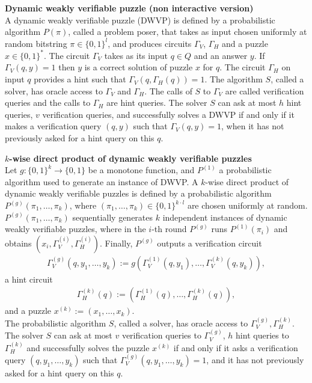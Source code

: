 \begin{definition} {\textbf{Dynamic weakly verifiable puzzle (non interactive version)}}\\
  A dynamic weakly verifiable puzzle (DWVP) is defined by a probabilistic algorithm $P(\pi)$,
  called a problem poser, that takes as input chosen uniformly at random bitstring $\pi \in \{0,1\}^l$,
  and produces circuits $\Gamma_{V}$, $\Gamma_{H}$ and a puzzle $x \in \{0,1\}^{*}$.
  The circuit $\Gamma_{V}$ takes as its input $q \in Q$ and an answer $y$.
  If $\Gamma_V(q,y) = 1$ then $y$ is a correct solution of puzzle $x$ for $q$.
  The circuit $\Gamma_H$ on input $q$ provides a hint such that $\Gamma_V(q,\Gamma_H(q)) = 1$.
  The algorithm $S$, called a solver, has oracle access to $\Gamma_V$ and $\Gamma_H$.
  The calls of $S$ to $\Gamma_V$ are called verification queries and the calls to $\Gamma_H$ are hint queries.
  The solver $S$ can ask at most $h$ hint queries, $v$ verification queries, and successfully solves a DWVP if and only if
  it makes a verification query $(q,y)$ such that $\Gamma_V(q,y) = 1$, when it has not previously asked for a hint query on this $q$.
\end{definition}
%
%
\begin{definition}{\textbf{$k$-wise direct product of dynamic weakly verifiable puzzles}}\\
Let $g: \{0,1\}^{k} \rightarrow \{0,1\}$ be a monotone function, and $P^{(1)}$ a probabilistic algorithm used to generate an instance of DWVP.
A $k$-wise direct product of dynamic weakly verifiable puzzles is defined by a probabilistic algorithm $P^{(g)}\left(\pi_1, \dots, \pi_k \right)$,
where $(\pi_1, \dots, \pi_k) \in \{0,1\}^{k \cdot l}$ are chosen uniformly at random.
$P^{(g)}\left(\pi_1, \dots, \pi_k \right)$ sequentially generates $k$ independent instances of dynamic weakly verifiable puzzles,
where in the $i$-th round $P^{(g)}$ runs $P^{(1)}(\pi_i)$ and obtains $(x_i, \Gamma_V^{(i)}, \Gamma_H^{(i)} )$.
Finally, $P^{(g)}$ outputs a verification circuit
\begin{align*}
  \Gamma_V^{(g)} (q, y_1, \dots, y_k) := g(\Gamma_V^{(1)}(q, y_1), \dots, \Gamma_V^{(k)}(q, y_k)),
\end{align*}
a hint circuit
\begin{align*}
  \Gamma_H^{(k)} (q) := (\Gamma_H^{(1)}(q), \dots, \Gamma_H^{(k)}(q)),
\end{align*}
and a puzzle $x^{(k)} := (x_1, \dots, x_k)$.
\\
The probabilistic algorithm $S$, called a solver, has oracle access to $\Gamma_V^{(g)}, \Gamma_H^{(k)}$.
The solver $S$ can ask at most $v$ verification queries to $\Gamma_V^{(g)}$, $h$ hint queries to $\Gamma_H^{(k)}$ and successfully solves the puzzle $x^{(k)}$
if and only if it asks a verification query $(q, y_1, \dots, y_k)$ such that $\Gamma_V^{(g)}(q, y_1, \dots, y_k) = 1$, and it has not previously asked for a hint query on this $q$.
\end{definition}
